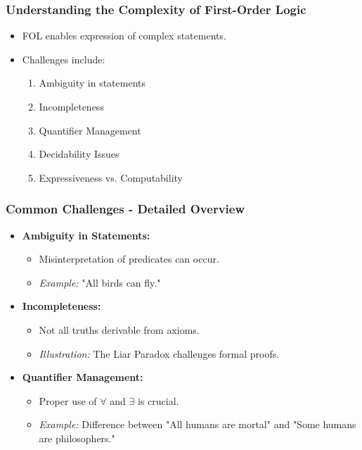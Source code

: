 \documentclass[aspectratio=169]{beamer}
\begin{document}
\begin{frame}[fragile]
    \frametitle{Understanding the Complexity of First-Order Logic}
    \begin{itemize}
        \item FOL enables expression of complex statements.
        \item Challenges include:
        \begin{enumerate}
            \item Ambiguity in statements
            \item Incompleteness
            \item Quantifier Management
            \item Decidability Issues
            \item Expressiveness vs. Computability
        \end{enumerate}
    \end{itemize}
\end{frame}

\begin{frame}[fragile]
    \frametitle{Common Challenges - Detailed Overview}
    \begin{itemize}
        \item \textbf{Ambiguity in Statements:}
        \begin{itemize}
            \item Misinterpretation of predicates can occur.
            \item \textit{Example:} "All birds can fly."
        \end{itemize}

        \item \textbf{Incompleteness:}
        \begin{itemize}
            \item Not all truths derivable from axioms.
            \item \textit{Illustration:} The Liar Paradox challenges formal proofs.
        \end{itemize}

        \item \textbf{Quantifier Management:}
        \begin{itemize}
            \item Proper use of $\forall$ and $\exists$ is crucial.
            \item \textit{Example:} Difference between "All humans are mortal" and "Some humans are philosophers."
        \end{itemize}
    \end{itemize}
\end{frame}
\end{document}
